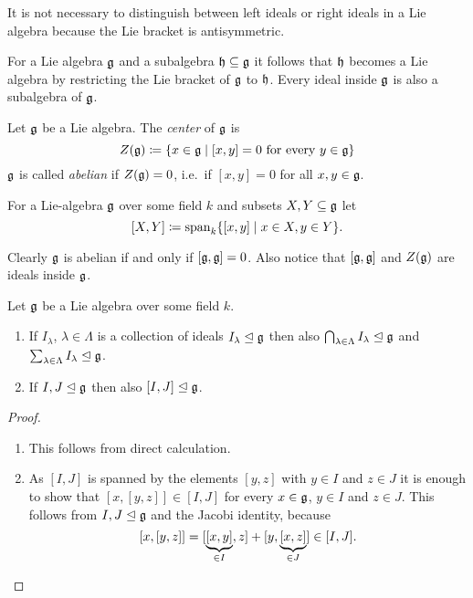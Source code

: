\begin{rem}
 It is not necessary to distinguish between left ideals or right ideals in a Lie algebra because the Lie bracket is antisymmetric.
\end{rem}


\begin{rem}
 For a Lie algebra $\mathfrak{g}$ and a subalgebra $\mathfrak{h} \subseteq \mathfrak{g}$ it follows that $\mathfrak{h}$ becomes a Lie algebra by restricting the Lie bracket of $\mathfrak{g}$ to $\mathfrak{h}$. Every ideal inside $\mathfrak{g}$ is also a subalgebra of $\mathfrak{g}$.
\end{rem}


\begin{defi}
 Let $\mathfrak{g}$ be a Lie algebra. The \emph{center} of $\mathfrak{g}$ is
 \[
  Z(\mathfrak{g}) \coloneqq \{x \in \mathfrak{g} \mid \text{$[x,y] = 0$ for every $y \in \mathfrak{g}$}\}
 \]
 $\mathfrak{g}$ is called \emph{abelian} if $Z(\mathfrak{g}) = 0$, i.e.\ if $[x,y] = 0$ for all $x,y \in \mathfrak{g}$.
\end{defi}


\begin{defi}
 For a Lie-algebra $\mathfrak{g}$ over some field $k$ and subsets $X, Y \subseteq \mathfrak{g}$ let
 \[
  [X,Y] \coloneqq \operatorname{span}_k \{[x,y] \mid x \in X, y \in Y\}.
 \]
\end{defi}


\begin{rem}
 Clearly $\mathfrak{g}$ is abelian if and only if $[\mathfrak{g},\mathfrak{g}] = 0$. Also notice that $[\mathfrak{g},\mathfrak{g}]$ and $Z(\mathfrak{g})$ are ideals inside $\mathfrak{g}$.
\end{rem}


\begin{lem}
 Let $\mathfrak{g}$ be a Lie algebra over some field $k$.
 \begin{enumerate}[leftmargin=*]
  \item
   If $I_\lambda$, $\lambda \in \Lambda$ is a collection of ideals $I_\lambda \trianglelefteq \mathfrak{g}$ then also $\bigcap_{\lambda \in \Lambda} I_\lambda \trianglelefteq \mathfrak{g}$ and $\sum_{\lambda \in \Lambda} I_\lambda \trianglelefteq \mathfrak{g}$.
  \item
   If $I, J \trianglelefteq \mathfrak{g}$ then also $[I,J] \trianglelefteq \mathfrak{g}$.
 \end{enumerate}
\end{lem}
\begin{proof}
 \begin{enumerate}[leftmargin=*]
  \item
   This follows from direct calculation.
  \item
   As $[I,J]$ is spanned by the elements $[y,z]$ with $y \in I$ and $z \in J$ it is enough to show that $[x,[y,z]] \in [I,J]$ for every $x \in \mathfrak{g}$, $y \in I$ and $z \in J$. This follows from $I, J \trianglelefteq \mathfrak{g}$ and the Jacobi identity, because
   \[
    [x,[y,z]]
    = [\underbrace{[x,y]}_{\in I},z] + [y,\underbrace{[x,z]}_{\in J}]
    \in [I,J].
   \qedhere
   \]
 \end{enumerate}
\end{proof}



